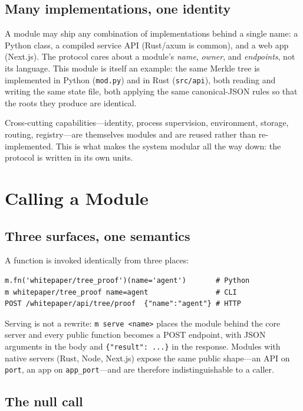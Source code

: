 \documentclass[11pt,a4paper]{article}
\begin{document}
\subsection{Many implementations, one identity}

A module may ship any combination of implementations behind a single name: a
Python class, a compiled service API (Rust/axum is common), and a web app
(Next.js). The protocol cares about a module's \emph{name}, \emph{owner}, and
\emph{endpoints}, not its language. This module is itself an example: the same
Merkle tree is implemented in Python (\texttt{mod.py}) and in Rust
(\texttt{src/api}), both reading and writing the same state file, both applying
the same canonical-JSON rules so that the roots they produce are identical.

Cross-cutting capabilities---identity, process supervision, environment,
storage, routing, registry---are themselves modules and are reused rather than
re-implemented. This is what makes the system modular all the way down: the
protocol is written in its own units.

\section{Calling a Module}

\subsection{Three surfaces, one semantics}

A function is invoked identically from three places:

\begin{lstlisting}[style=python]
m.fn('whitepaper/tree_proof')(name='agent')       # Python
m whitepaper/tree_proof name=agent                # CLI
POST /whitepaper/api/tree/proof  {"name":"agent"} # HTTP
\end{lstlisting}

Serving is not a rewrite: \texttt{m serve <name>} places the module behind the
core server and every public function becomes a POST endpoint, with JSON
arguments in the body and \texttt{\{"result": ...\}} in the response. Modules
with native servers (Rust, Node, Next.js) expose the same public shape---an API
on \texttt{port}, an app on \texttt{app\_port}---and are therefore
indistinguishable to a caller.

\subsection{The null call}
\end{document}
